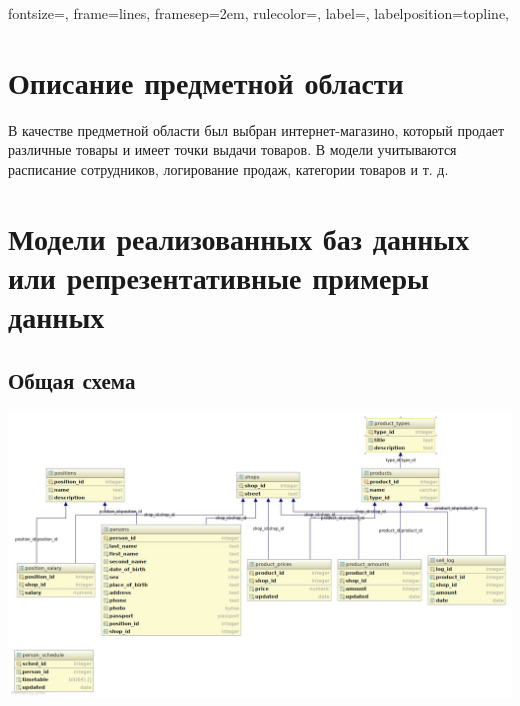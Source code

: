 

\usepackage{graphicx}
\usepackage{adjustbox}
\usepackage{multirow}

\def \labtype {Курсовая}
\def \labsubj {Системы баз данных}
\def \labauthor {Айтуганов Д. А. \\ Чебыкин И. Б.}
\def \labgroup {P3301}
\def \labinsp {Беликов П. А.}
\def \labname{Разработка базы данных интернет-магазина}
\isonefalse
\isnametrue
\isnumfalse

\usepackage[dvipsnames]{xcolor}
\usepackage{fancyvrb}
\usepackage{graphicx}
\usepackage{xunicode}
\usepackage{xltxtra}
\setmonofont{DejaVu Sans Mono}
 { fontsize=\scriptsize,
 frame=lines,  %
 framesep=2em, %
 rulecolor=\color{Gray},
 label=,
 labelposition=topline,
}



\tableofcontents
\newpage
\section{Описание предметной области}
В качестве предметной области был выбран интернет-магазино, который продает
различные товары и имеет точки выдачи товаров.
В модели учитываются расписание сотрудников, логирование
продаж, категории товаров и т. д.

\section{Модели реализованных баз данных или репрезентативные примеры данных}

\subsection{Общая схема}
\includegraphics[width=500bp]{img/diagram.jpg}

